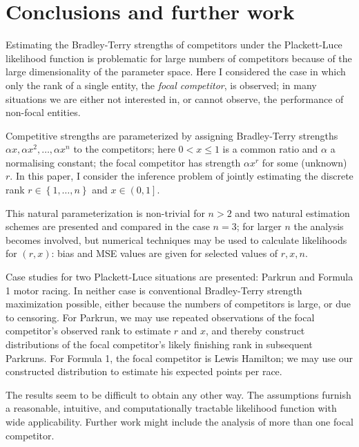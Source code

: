 \documentclass[article]{ajs}  %
\begin{document}
\section{Conclusions and further work}

Estimating the Bradley-Terry strengths of competitors under the
Plackett-Luce likelihood function is problematic for large numbers of
competitors because of the large dimensionality of the parameter
space.  Here I considered the case in which only the rank of a single
entity, the {\em focal competitor}, is observed; in many situations we
are either not interested in, or cannot observe, the performance of
non-focal entities.

Competitive strengths are parameterized by assigning Bradley-Terry
strengths $\alpha x,\alpha x^2,\ldots,\alpha x^n$ to the competitors;
here $0 <x\leqslant 1$ is a common ratio and $\alpha$ a normalising
constant; the focal competitor has strength $\alpha x^r$ for some
(unknown) $r$.  In this paper, I consider the inference problem of
jointly estimating the discrete rank $r\in\left\lbrace
1,\ldots,n\right\rbrace$ and $x\in\left(0,1\right]$.

This natural parameterization is non-trivial for $n>2$ and two natural
estimation schemes are presented and compared in the case $n=3$; for
larger $n$ the analysis becomes involved, but numerical techniques may
be used to calculate likelihoods for $(r,x)$: bias and MSE values are
given for selected values of $r,x,n$.

Case studies for two Plackett-Luce situations are presented: Parkrun
and Formula 1 motor racing.  In neither case is conventional
Bradley-Terry strength maximization possible, either because the
numbers of competitors is large, or due to censoring.  For Parkrun, we
may use repeated observations of the focal competitor's observed rank
to estimate $r$ and $x$, and thereby construct distributions of the
focal competitor's likely finishing rank in subsequent Parkruns.  For
Formula 1, the focal competitor is Lewis Hamilton; we may use our
constructed distribution to estimate his expected points per race.

The results seem to be difficult to obtain any other way.  The
assumptions furnish a reasonable, intuitive, and computationally
tractable likelihood function with wide applicability.  Further work
might include the analysis of more than one focal competitor.


%

\end{document}
